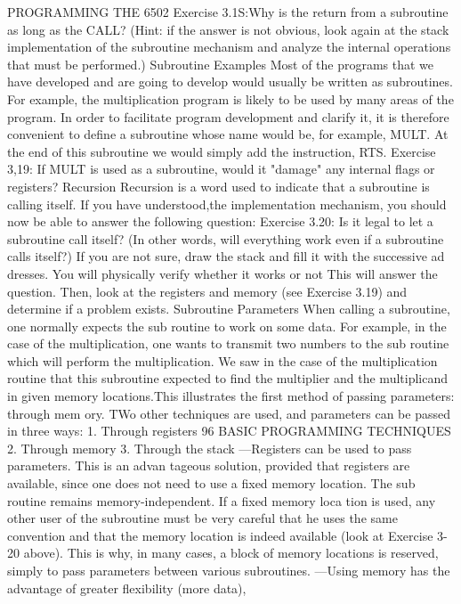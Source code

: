 PROGRAMMING THE 6502
Exercise 3.1S:Why is the return from a subroutine as long as the
CALL? (Hint: if the answer is not obvious, look again at the stack
implementation of the subroutine mechanism and analyze the
internal operations that must be performed.)
Subroutine Examples
Most of the programs that we have developed and are going to
develop would usually be written as subroutines. For example,
the multiplication program is likely to be used by many areas of
the program. In order to facilitate program development and
clarify it, it is therefore convenient to define a subroutine whose
name would be, for example, MULT. At the end of this subroutine
we would simply add the instruction, RTS.
Exercise 3,19: If MULT is used as a subroutine, would it "damage"
any internal flags or registers?
Recursion
Recursion is a word used to indicate that a subroutine is calling
itself. If you have understood,the implementation mechanism,
you should now be able to answer the following question:
Exercise 3.20: Is it legal to let a subroutine call itself? (In other
words, will everything work even if a subroutine calls itself?) If
you are not sure, draw the stack and fill it with the successive ad
dresses. You will physically verify whether it works or not This
will answer the question. Then, look at the registers and memory
(see Exercise 3.19) and determine if a problem exists.
Subroutine Parameters
When calling a subroutine, one normally expects the sub
routine to work on some data. For example, in the case of the
multiplication, one wants to transmit two numbers to the sub
routine which will perform the multiplication. We saw in the case
of the multiplication routine that this subroutine expected to find
the multiplier and the multiplicand in given memory locations.This
illustrates the first method of passing parameters: through mem
ory. TWo other techniques are used, and parameters can be passed
in three ways:
1. Through registers
96
BASIC PROGRAMMING TECHNIQUES
2. Through memory
3. Through the stack
—Registers can be used to pass parameters. This is an advan
tageous solution, provided that registers are available, since
one does not need to use a fixed memory location. The sub
routine remains memory-independent. If a fixed memory loca
tion is used, any other user of the subroutine must be very
careful that he uses the same convention and that the memory
location is indeed available (look at Exercise 3-20 above). This is
why, in many cases, a block of memory locations is reserved,
simply to pass parameters between various subroutines.
—Using memory has the advantage of greater flexibility (more data),
